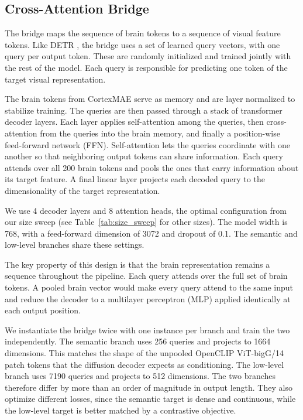 \documentclass[conference]{IEEEtran}
\begin{document}
\subsection{Cross-Attention Bridge}
\label{sec:bridge}
The bridge maps the sequence of brain tokens to a sequence of visual feature tokens. Like DETR \cite{DBLP:journals/corr/abs-2005-12872}, the bridge uses a set of learned query vectors, with one query per output token. These are randomly initialized and trained jointly with the rest of the model. Each query is responsible for predicting one token of the target visual representation.

The brain tokens from CortexMAE serve as memory and are layer normalized to stabilize training. The queries are then passed through a stack of transformer decoder layers. Each layer applies self-attention among the queries, then cross-attention from the queries into the brain memory, and finally a position-wise feed-forward network (FFN). Self-attention lets the queries coordinate with one another so that neighboring output tokens can share information. Each query attends over all 200 brain tokens and pools the ones that carry information about its target feature. A final linear layer projects each decoded query to the dimensionality of the target representation.

We use 4 decoder layers and 8 attention heads, the optimal configuration from our size sweep (see Table~\ref{tab:size_sweep} for other sizes). The model width is 768, with a feed-forward dimension of 3072 and dropout of 0.1. The semantic and low-level branches share these settings.

The key property of this design is that the brain representation remains a sequence throughout the pipeline. Each query attends over the full set of brain tokens. A pooled brain vector would make every query attend to the same input and reduce the decoder to a multilayer perceptron (MLP) applied identically at each output position.

We instantiate the bridge twice with one instance per branch and train the two independently. The semantic branch uses 256 queries and projects to 1664 dimensions. This matches the shape of the unpooled OpenCLIP ViT-bigG/14 \cite{radford2021learningtransferablevisualmodels, ilharco_gabriel_2021_5143773, schuhmann2022laionb} patch tokens that the diffusion decoder expects as conditioning. The low-level branch uses 7190 queries and projects to 512 dimensions. The two branches therefore differ by more than an order of magnitude in output length. They also optimize different losses, since the semantic target is dense and continuous, while the low-level target is better matched by a contrastive objective.
\end{document}

